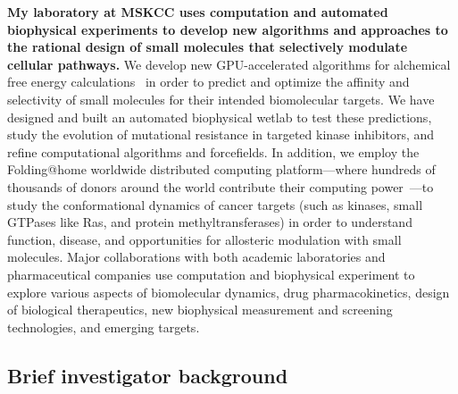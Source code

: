 \documentclass[10pt]{article}
\begin{document}
{\bf My laboratory at MSKCC uses computation and automated biophysical experiments to develop new algorithms and approaches to the rational design of small molecules that selectively modulate cellular pathways.}
We develop new GPU-accelerated algorithms for alchemical free energy calculations~\cite{tembe-mccammon:comput-chem:1984:alchemical-free-energy-calculations,shirts-mobley-chodera:2007:annu-rep-comput-chem:prime-time,chodera:curr-opin-struct-biol:2011:drug-discovery,wang:jcamd:2013:yank} in order to predict and optimize the affinity and selectivity of small molecules for their intended biomolecular targets.
We have designed and built an automated biophysical wetlab to test these predictions, study the evolution of mutational resistance in targeted kinase inhibitors, and refine computational algorithms and forcefields.
In addition, we employ the Folding@home worldwide distributed computing platform---where hundreds of thousands of donors around the world contribute their computing power~\cite{shirts-pande:science:2000:folding-at-home,folding-at-home-stats}---to study the conformational dynamics of cancer targets (such as kinases, small GTPases like Ras, and protein methyltransferases) in order to understand function, disease, and opportunities for allosteric modulation with small molecules.
Major collaborations with both academic laboratories and pharmaceutical companies use computation and biophysical experiment to explore various aspects of biomolecular dynamics, drug pharmacokinetics, design of biological therapeutics, new biophysical measurement and screening technologies, and emerging targets.

\subsection*{Brief investigator background}
\end{document}
